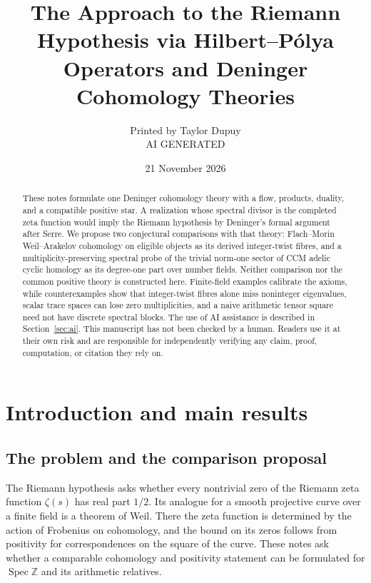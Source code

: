 \documentclass[11pt]{amsart}
\title[Hilbert--P\'olya operators and Deninger cohomology]{The Approach
to the Riemann Hypothesis via Hilbert--P\'olya Operators and Deninger
Cohomology Theories}
\date{21 November 2026}
\theoremstyle{plain}
\theoremstyle{definition}
\theoremstyle{remark}
\numberwithin{equation}{section}
\newcommand{\Z}{\mathbb{Z}}
\DeclareMathOperator{\Spec}{Spec}
\begin{document}
\begin{abstract}
These notes formulate one Deninger cohomology theory with a flow,
products, duality, and a compatible positive star.  A realization
whose spectral divisor is the completed zeta function would imply
the Riemann hypothesis by Deninger's formal argument after Serre.
We propose two conjectural comparisons with that theory:
Flach--Morin Weil--Arakelov cohomology on eligible objects as its
derived integer-twist fibres, and a multiplicity-preserving spectral
probe of the trivial norm-one sector of CCM adelic cyclic homology
as its degree-one part over number fields.
Neither comparison nor the common positive theory is constructed here.
Finite-field examples calibrate the axioms, while counterexamples
show that integer-twist fibres alone miss noninteger eigenvalues,
scalar trace spaces can lose zero multiplicities, and a naive
arithmetic tensor square need not have discrete spectral blocks.
The use of AI assistance is described in Section~\ref{sec:ai}.
This manuscript has not been checked by a human. Readers use it at
their own risk and are responsible for independently verifying any
claim, proof, computation, or citation they rely on.
\end{abstract}


\author{Printed by Taylor Dupuy \\
AI GENERATED}
\maketitle
\tableofcontents


\section{Introduction and main results}\label{sec:overview}

\subsection{The problem and the comparison proposal}
\label{subsec:search-findings}

The Riemann hypothesis asks whether every nontrivial zero of the
Riemann zeta function $\zeta(s)$ has real part $1/2$. Its analogue for a
smooth projective curve over a finite field is a theorem of Weil.
There the zeta function is determined by the action of Frobenius on
cohomology, and the bound on its zeros follows from positivity for
correspondences on the square of the curve. These notes ask whether
a comparable cohomology and positivity statement can be formulated for
$\Spec\Z$ and its arithmetic relatives.
\end{document}

